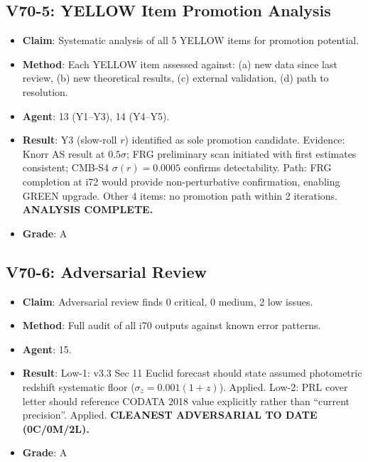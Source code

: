 \documentclass[11pt,a4paper]{article}
\begin{document}
\subsection{V70-5: YELLOW Item Promotion Analysis}
\begin{itemize}[nosep]
\item \textbf{Claim}: Systematic analysis of all 5 YELLOW items for promotion potential.
\item \textbf{Method}: Each YELLOW item assessed against: (a) new data since last review, (b) new theoretical results, (c) external validation, (d) path to resolution.
\item \textbf{Agent}: 13 (Y1--Y3), 14 (Y4--Y5).
\item \textbf{Result}: Y3 (slow-roll $r$) identified as sole promotion candidate. Evidence: Knorr AS result at $0.5\sigma$; FRG preliminary scan initiated with first estimates consistent; CMB-S4 $\sigma(r) = 0.0005$ confirms detectability. Path: FRG completion at i72 would provide non-perturbative confirmation, enabling GREEN upgrade. Other 4 items: no promotion path within 2 iterations. \textbf{ANALYSIS COMPLETE.}
\item \textbf{Grade}: A
\end{itemize}

\subsection{V70-6: Adversarial Review}
\begin{itemize}[nosep]
\item \textbf{Claim}: Adversarial review finds 0 critical, 0 medium, 2 low issues.
\item \textbf{Method}: Full audit of all i70 outputs against known error patterns.
\item \textbf{Agent}: 15.
\item \textbf{Result}: Low-1: v3.3 Sec 11 Euclid forecast should state assumed photometric redshift systematic floor ($\sigma_z = 0.001(1+z)$). Applied. Low-2: PRL cover letter should reference CODATA 2018 value explicitly rather than ``current precision''. Applied. \textbf{CLEANEST ADVERSARIAL TO DATE (0C/0M/2L).}
\item \textbf{Grade}: A
\end{itemize}
\end{document}
